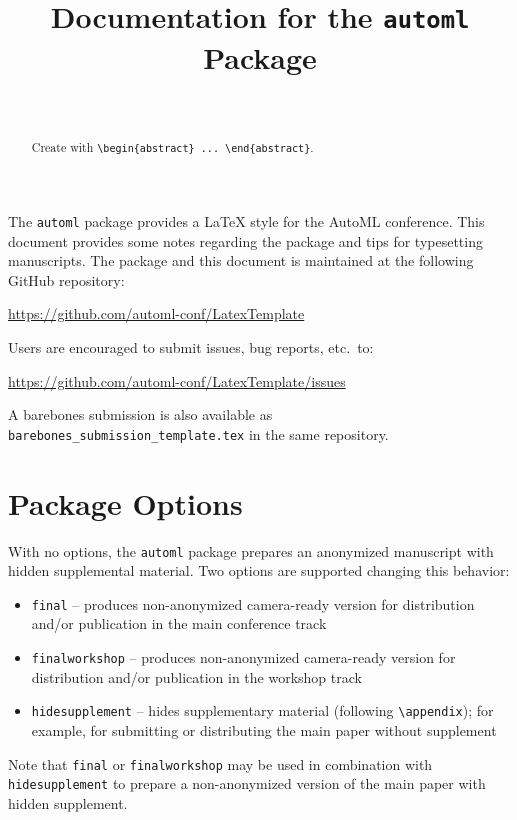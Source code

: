 \documentclass[11pt]{article}
\title{Documentation for the \texttt{automl} Package}
\author[1]{\nameemail{Author 1}{email1@example.com}}
\author[2,3]{\nameemail{Author 2}{email2@example.com}}
\author[3]{\nameemail{Author 3}{email3@example.com}}
\author[4]{\nameemail{Author 4}{email4@example.com}}
\author[3]{\\\nameemail{Author 5}{email5@example.com}}
\affil[1]{Institution 1}
\affil[2]{Institution 2}
\affil[3]{Institution 3}
\affil[4]{Institution 4}
\begin{document}
\maketitle

\begin{abstract}
  Create with \verb|\begin{abstract} ... \end{abstract}|.
\end{abstract}

The \texttt{automl} package provides a \LaTeX{} style for the AutoML conference.
This document provides some notes regarding the package and tips for typesetting
manuscripts. The package and this document is maintained at the following GitHub
repository:
\begin{center}
  \url{https://github.com/automl-conf/LatexTemplate}
\end{center}
Users are encouraged to submit issues, bug reports, etc.\ to:
\begin{center}
  \url{https://github.com/automl-conf/LatexTemplate/issues}
\end{center}

A barebones submission is also available as
\texttt{barebones\_submission\_template.tex} in the same repository.

\section{Package Options}

With no options, the \texttt{automl} package prepares an anonymized manuscript
with hidden supplemental material. Two options are supported changing this
behavior:
\begin{itemize}
\item \texttt{final} -- produces non-anonymized camera-ready version for
  distribution and/or publication in the main conference track
\item \texttt{finalworkshop} -- produces non-anonymized camera-ready version for
  distribution and/or publication in the workshop track
\item \texttt{hidesupplement} -- hides supplementary material (following
  \verb|\appendix|); for example, for submitting or distributing the main paper
  without supplement
\end{itemize}
Note that \texttt{final} or \texttt{finalworkshop} may be used in combination
with \texttt{hidesupplement} to prepare a non-anonymized version of the main
paper with hidden supplement.
\end{document}
